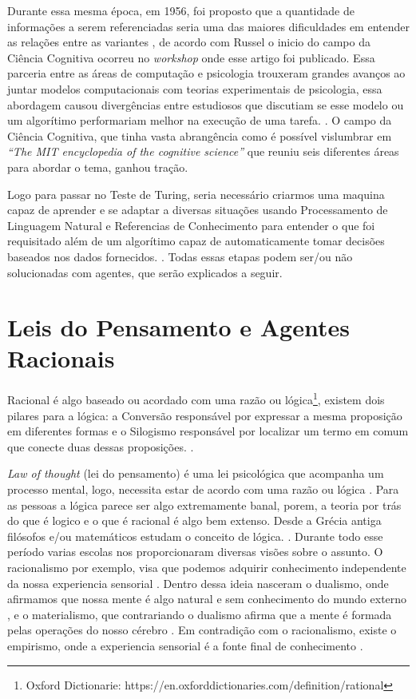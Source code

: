 Durante essa mesma época, em 1956, foi proposto que a quantidade de informações a serem referenciadas seria uma das maiores dificuldades em entender as relações entre as variantes \cite[81-82]{miller1956magical}, de acordo com Russel \cite[13]{russell2003artificial} o inicio do campo da Ciência Cognitiva ocorreu no \textit{workshop} onde esse artigo foi publicado. Essa parceria entre as áreas de computação e psicologia trouxeram grandes avanços ao juntar modelos computacionais com teorias experimentais de psicologia, essa abordagem causou divergências entre estudiosos que discutiam se esse modelo ou um algorítimo performariam melhor na execução de uma tarefa. \cite[3]{russell2003artificial}. O campo da Ciência Cognitiva,  que tinha vasta abrangência como é possível vislumbrar em \textit{“The MIT encyclopedia of the cognitive science”} \cite{wilson2001encyclopedia} que reuniu seis diferentes áreas para abordar o tema, ganhou tração.

Logo para passar no Teste de Turing, seria necessário criarmos uma maquina capaz de aprender e se adaptar a diversas situações usando Processamento de Linguagem Natural e Referencias de Conhecimento para entender o que foi requisitado além de um algorítimo capaz de automaticamente tomar decisões baseados nos dados fornecidos. \cite[2]{russell2003artificial}. Todas essas etapas podem ser/ou não solucionadas com agentes, que serão explicados a seguir.

\section{Leis do Pensamento e Agentes Racionais}

Racional é algo baseado ou acordado com uma razão ou lógica\footnote{Oxford Dictionarie:  https://en.oxforddictionaries.com/definition/rational}, existem dois pilares para a lógica: a Conversão responsável por expressar a mesma proposição em diferentes formas e o Silogismo responsável por localizar um termo em comum que conecte duas dessas proposições. \cite[175]{boole1854investigation}.

\textit{Law of thought} (lei do pensamento) é uma lei psicológica que acompanha um processo mental, logo, necessita estar de acordo com uma razão ou lógica \cite[289-291]{frege1956thought}. Para as pessoas a lógica parece ser algo extremamente banal, porem, a teoria por trás do que é logico e o que é racional é algo bem extenso. Desde a Grécia antiga filósofos e/ou matemáticos estudam o conceito de lógica. \cite[4-5]{russell2003artificial}. Durante todo esse período varias escolas nos proporcionaram diversas visões sobre o assunto. O racionalismo por exemplo, visa que podemos adquirir conhecimento independente da nossa experiencia sensorial \cite{rationalismvsempiricism}. Dentro dessa ideia nasceram o dualismo, onde afirmamos que nossa mente é algo natural e sem conhecimento do mundo externo \cite[7]{descartes2013rene}, e o materialismo, que contrariando o dualismo afirma que a mente é formada pelas operações do nosso cérebro \cite[6]{russell2003artificial}.
Em contradição com o racionalismo, existe o empirismo, onde a experiencia sensorial é a fonte final de conhecimento \cite{rationalismvsempiricism}.


